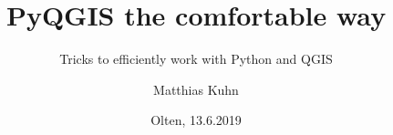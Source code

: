\title{PyQGIS the comfortable way}
\subtitle{Tricks to efficiently work with Python and QGIS}
\author[Matthias] %
{Matthias Kuhn}

\date{Olten, 13.6.2019}
\subject{Computer Science}




	\frame[plain]{\titlepage}
	

	
	
	
	
	

